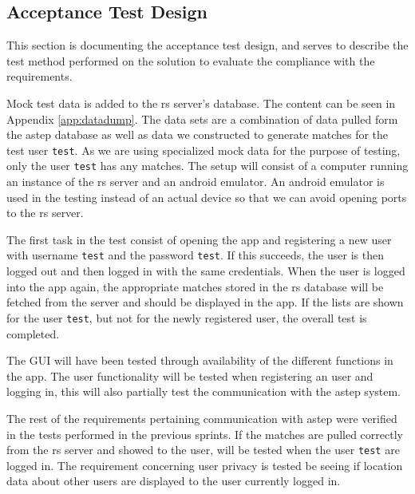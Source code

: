\subsection{Acceptance Test Design}
This section is documenting the acceptance test design, and serves to describe the test method performed on the solution to evaluate the compliance with the requirements.

Mock test data is added to the \gls{rs} server's database. 
The content can be seen in Appendix \ref{app:datadump}. 
The data sets are a combination of data pulled form the \gls{astep} database as well as data we constructed to generate matches for the test user \texttt{test}.
As we are using specialized mock data for the purpose of testing, only the user \texttt{test} has any matches.
The setup will consist of a computer running an instance of the \gls{rs} server and an android emulator.
An android emulator is used in the testing instead of an actual device so that we can avoid opening ports to the \gls{rs} server.

The first task in the test consist of opening the app and registering a new user with username \texttt{test} and the password \texttt{test}.
If this succeeds, the user is then logged out and then logged in with the same credentials.
When the user is logged into the app again, the appropriate matches stored in the \gls{rs} database will be fetched from the server and should be displayed in the app.
If the lists are shown for the user \texttt{test}, but not for the newly registered user, the overall test is completed. 

The GUI will have been tested through availability of the different functions in the app.
The user functionality will be tested when registering an user and logging in, this will also partially test the communication with the \gls{astep} system.


The rest of the requirements pertaining communication with \gls{astep} were verified in the tests performed in the previous sprints.
If the matches are pulled correctly from the \gls{rs} server and showed to the user, will be tested when the user \texttt{test} are logged in.
The requirement concerning user privacy is tested be seeing if location data about other users are displayed to the user currently logged in. 


